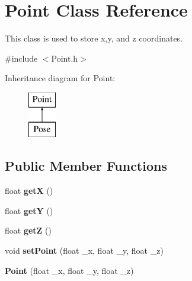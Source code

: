 \hypertarget{class_point}{
\section{Point Class Reference}
\label{class_point}
}


This class is used to store x,y, and z coordinates.  




{\ttfamily \#include $<$Point.h$>$}

Inheritance diagram for Point:\begin{figure}[H]
\begin{center}
\leavevmode
\includegraphics[height=2.000000cm]{class_point}
\end{center}
\end{figure}
\subsection*{Public Member Functions}
\begin{DoxyCompactItemize}
\item 
\hypertarget{class_point_acc27466778cc87a662bba40268c4c0c8}{
float {\bfseries getX} ()}
\label{class_point_acc27466778cc87a662bba40268c4c0c8}

\item 
\hypertarget{class_point_a3cccbca94719ddde353cce86ce0e2f64}{
float {\bfseries getY} ()}
\label{class_point_a3cccbca94719ddde353cce86ce0e2f64}

\item 
\hypertarget{class_point_adfd464bbfabdcecdcc14eb83cf6d2830}{
float {\bfseries getZ} ()}
\label{class_point_adfd464bbfabdcecdcc14eb83cf6d2830}

\item 
\hypertarget{class_point_af2a602d5d53872fff27313639da37e3b}{
void {\bfseries setPoint} (float \_\-x, float \_\-y, float \_\-z)}
\label{class_point_af2a602d5d53872fff27313639da37e3b}

\item 
\hypertarget{class_point_aef2feff94db53418730e802319eb4fe7}{
{\bfseries Point} (float \_\-x, float \_\-y, float \_\-z)}
\label{class_point_aef2feff94db53418730e802319eb4fe7}

\end{DoxyCompactItemize}


